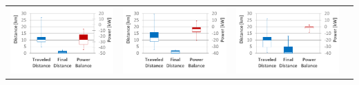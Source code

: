 \begin{table}[b]
\begin{tabularx}{\textwidth}{|Y|Y|Y|Y|}
		\includegraphics[trim=0 0 0 -3,scale=0.285]{../gfx/data/E1_002.png} &
		\includegraphics[trim=0 0 0 -3,scale=0.285]{../gfx/data/E2_002.png} &
		\includegraphics[trim=0 0 0 -3,scale=0.285]{../gfx/data/E3_002.png} &

\end{tabularx}
\end{table}
